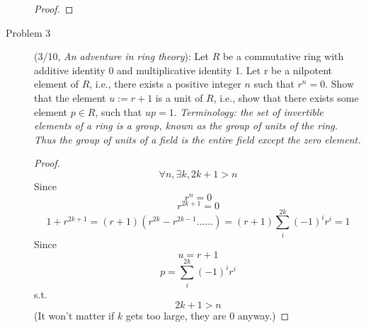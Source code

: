 \documentclass{article}
\begin{document}
\begin{description}
\begin{proof}
	\end{proof}

	\item[Problem 3](3/10, \textit{An adventure in ring theory}):{
    Let $R$ be a commutative ring with additive identity 0 and multiplicative identity 1. Let r be a nilpotent element of $R$, i.e., there exists a positive integer $n$ such that $r^{n} = 0$. Show that the element $u := r + 1$ is a unit of $R$, i.e., show that there exists some element $p \in R$, such that $up = 1$. \emph{Terminology: the set of invertible elements of a ring is a group, known as the group of units of the ring. Thus the group of units of a field is the entire field except the zero element. }}
	\begin{proof}

		$$\forall n, \exists k, 2k+1>n$$
		Since $$r^n = 0$$
		$$r^{2k+1} = 0$$
		$$1+r^{2k+1} = (r+1)(r^{2k}-r^{2k-1}......) = (r+1)\sum_i^{2k}(-1)^ir^{i} = 1$$
		Since $$u = r+1$$
		$$p = \sum_i^{2k}(-1)^ir^{i}$$
		s.t.  $$2k+1 > n$$
		(It won't matter if $k$ gets too large, they are 0 anyway.)

	\end{proof}
\end{description}
\end{document}
